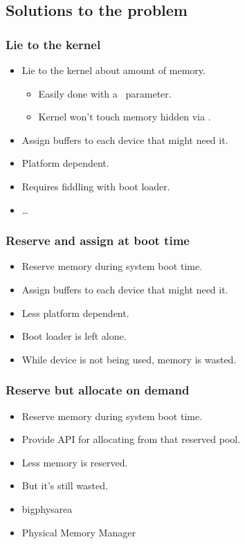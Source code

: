 
\subsection{Solutions to the problem}

\begin{frame}
  \frametitle{Lie to the kernel}

  \begin{itemize}
  \item Lie to the kernel about amount of memory.
    \begin{itemize}
    \item Easily done with a~ parameter.
    \item Kernel won't touch memory hidden via .
    \end{itemize}
  \item Assign buffers to each device that might need it.
  \item Platform dependent.
  \item Requires fiddling with boot loader.
  \item \ldots
  \end{itemize}
\end{frame}

\begin{frame}
  \frametitle{Reserve and assign at boot time}

  \begin{itemize}
  \item Reserve memory during system boot time.
  \item Assign buffers to each device that might need it.
  \item Less platform dependent.
  \item Boot loader is left alone.
  \item While device is not being used, memory is wasted.
  \end{itemize}
\end{frame}

\begin{frame}
  \frametitle{Reserve but allocate on demand}

  \begin{itemize}
  \item Reserve memory during system boot time.
  \item Provide API for allocating from that reserved pool.
  \item Less memory is reserved.
  \item But it's still wasted.
  \end{itemize}

  \begin{itemize}
  \item bigphysarea
  \item Physical Memory Manager
  \end{itemize}
\end{frame}

